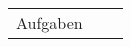 \documentclass{article}
\begin{document}

\begin{center}
\begin{tabular}{ccc}
Aufgaben
\end{tabular}
\end{center}
\end{document}
